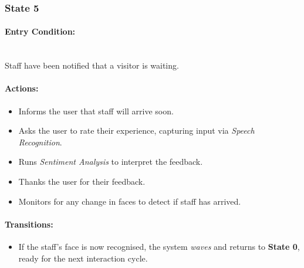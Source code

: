 \documentclass[conference]{IEEEtran}
\begin{document}
\subsubsection{State 5}
\paragraph{Entry Condition:}
\mbox{}\\
Staff have been notified that a visitor is waiting.

\paragraph{Actions:}
\begin{itemize}
  \item Informs the user that staff will arrive soon.
  \item Asks the user to rate their experience, capturing input via \emph{Speech Recognition}.
  \item Runs \emph{Sentiment Analysis} to interpret the feedback.
  \item Thanks the user for their feedback.
  \item Monitors for any change in faces to detect if staff has arrived.
\end{itemize}

\paragraph{Transitions:}
\begin{itemize}
  \item If the staff’s face is now recognised, the system \emph{waves} and returns to \textbf{State 0}, ready for the next interaction cycle.
\end{itemize}
\end{document}
